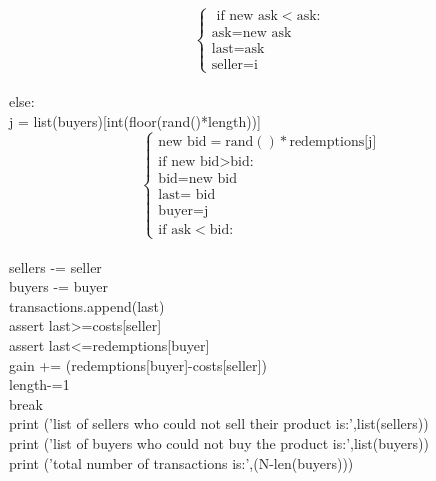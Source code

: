 \documentclass[10pt,a4paper,oneside]{report}
\begin{document}
\begin{appendix}
\begin{listing}
            \begin{equation*}
            \begin{cases}
           \text{ if new ask}<\text{ask}:\\
                \text{ask} = \text{new ask}\\
                \text{last} = \text{ask}\\
            \text{seller} = \text{i}                                        
\end{cases}            
            \end{equation*} \\
        else:\\
            j = list(buyers)[int(floor(rand()*length))]\\  %
            \begin{equation*}
            \begin{cases}
            \text{new bid} = \text{rand}()*\text{redemptions[j]}             \\ %
            \text{if new bid}>\text{bid:}\\
                \text{bid} = \text{new bid}\\
                \text{last} =\text{ bid}\\
                \text{buyer} = \text{j}\\
        \text{if ask}<\text{bid}:                                   
 \end{cases}        
         \end{equation*} \\ %
            sellers -= {seller}                         \\ %
            buyers -= {buyer}                           \\ %
            transactions.append(last)                    \\
            assert last>=costs[seller]                  \\ %
            assert last<=redemptions[buyer]             \\ %
            gain += (redemptions[buyer]-costs[seller])\\   %
            length-=1\\
            break\\
print ('list of sellers who could not sell their product is:',list(sellers))\\
print ('list of buyers who could not buy the product is:',list(buyers))\\
print ('total number of transactions is:',(N-len(buyers)))\\
\end{listing}
\end{appendix}
\end{document}
